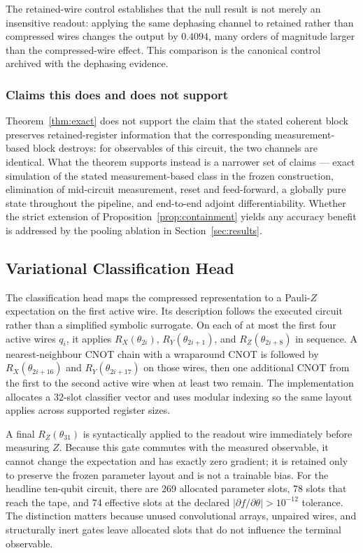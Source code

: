 \documentclass[conference]{IEEEtran}
\begin{document}
The retained-wire control establishes that the null result is not merely an insensitive readout: applying the same dephasing channel to retained rather than compressed wires changes the output by $0.4094$, many orders of magnitude larger than the compressed-wire effect. This comparison is the canonical control archived with the dephasing evidence.

\subsubsection{Claims this does and does not support}
Theorem~\ref{thm:exact} does not support the claim that the stated coherent block preserves retained-register information that the corresponding measurement-based block destroys: for observables of this circuit, the two channels are identical. What the theorem supports instead is a narrower set of claims --- exact simulation of the stated measurement-based class in the frozen construction, elimination of mid-circuit measurement, reset and feed-forward, a globally pure state throughout the pipeline, and end-to-end adjoint differentiability. Whether the strict extension of Proposition~\ref{prop:containment} yields any accuracy benefit is addressed by the pooling ablation in Section~\ref{sec:results}.

\subsection{Variational Classification Head}
The classification head maps the compressed representation to a Pauli-$Z$ expectation on the first active wire. Its description follows the executed circuit rather than a simplified symbolic surrogate. On each of at most the first four active wires $q_i$, it applies $R_X(\theta_{2i})$, $R_Y(\theta_{2i+1})$, and $R_Z(\theta_{2i+8})$ in sequence. A nearest-neighbour CNOT chain with a wraparound CNOT is followed by $R_X(\theta_{2i+16})$ and $R_Y(\theta_{2i+17})$ on those wires, then one additional CNOT from the first to the second active wire when at least two remain. The implementation allocates a 32-slot classifier vector and uses modular indexing so the same layout applies across supported register sizes.

A final $R_Z(\theta_{31})$ is syntactically applied to the readout wire immediately before measuring $Z$. Because this gate commutes with the measured observable, it cannot change the expectation and has exactly zero gradient; it is retained only to preserve the frozen parameter layout and is not a trainable bias. For the headline ten-qubit circuit, there are 269 allocated parameter slots, 78 slots that reach the tape, and 74 effective slots at the declared $|\partial f/\partial\theta|>10^{-12}$ tolerance. The distinction matters because unused convolutional arrays, unpaired wires, and structurally inert gates leave allocated slots that do not influence the terminal observable.
\end{document}
